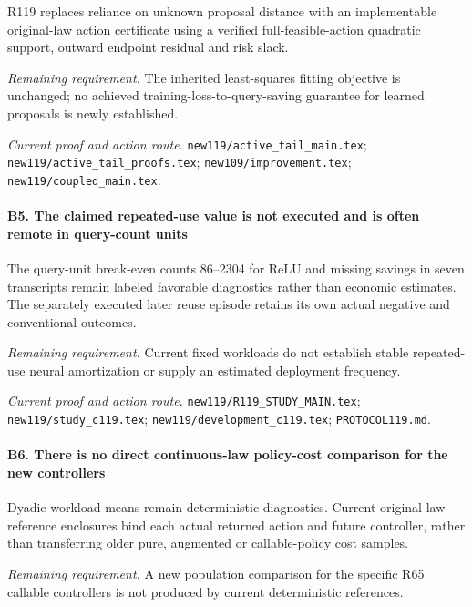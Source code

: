 R119 replaces reliance on unknown proposal distance with an implementable original-law action certificate using a verified full-feasible-action quadratic support, outward endpoint residual and risk slack.

\par\emph{Remaining requirement.} The inherited least-squares fitting objective is unchanged; no achieved training-loss-to-query-saving guarantee for learned proposals is newly established.

\par\emph{Current proof and action route.} \nolinkurl{new119/active_tail_main.tex}; \nolinkurl{new119/active_tail_proofs.tex}; \nolinkurl{new109/improvement.tex}; \nolinkurl{new119/coupled_main.tex}.

\paragraph{B5. The claimed repeated-use value is not executed and is often remote in query-count units}

The query-unit break-even counts 86--2304 for ReLU and missing savings in seven transcripts remain labeled favorable diagnostics rather than economic estimates. The separately executed later reuse episode retains its own actual negative and conventional outcomes.

\par\emph{Remaining requirement.} Current fixed workloads do not establish stable repeated-use neural amortization or supply an estimated deployment frequency.

\par\emph{Current proof and action route.} \nolinkurl{new119/R119_STUDY_MAIN.tex}; \nolinkurl{new119/study_c119.tex}; \nolinkurl{new119/development_c119.tex}; \nolinkurl{PROTOCOL119.md}.

\paragraph{B6. There is no direct continuous-law policy-cost comparison for the new controllers}

Dyadic workload means remain deterministic diagnostics. Current original-law reference enclosures bind each actual returned action and future controller, rather than transferring older pure, augmented or callable-policy cost samples.

\par\emph{Remaining requirement.} A new population comparison for the specific R65 callable controllers is not produced by current deterministic references.

